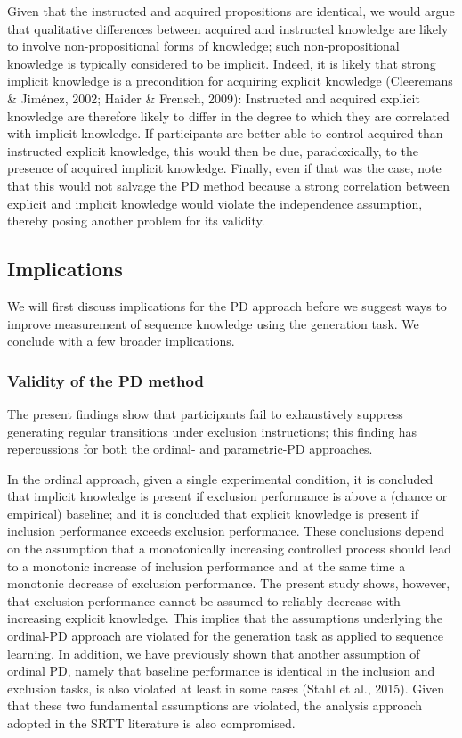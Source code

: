 \documentclass[jou]{apa6}
\theoremstyle{definition}
\theoremstyle{definition}
\theoremstyle{definition}
\theoremstyle{remark}
\begin{document}
Given that the instructed and acquired propositions are identical, we
would argue that qualitative differences between acquired and instructed
knowledge are likely to involve non-propositional forms of knowledge;
such non-propositional knowledge is typically considered to be implicit.
Indeed, it is likely that strong implicit knowledge is a precondition
for acquiring explicit knowledge (Cleeremans \& Jiménez, 2002; Haider \&
Frensch, 2009): Instructed and acquired explicit knowledge are therefore
likely to differ in the degree to which they are correlated with
implicit knowledge. If participants are better able to control acquired
than instructed explicit knowledge, this would then be due,
paradoxically, to the presence of acquired implicit knowledge. Finally,
even if that was the case, note that this would not salvage the PD
method because a strong correlation between explicit and implicit
knowledge would violate the independence assumption, thereby posing
another problem for its validity.

\subsection{Implications}\label{implications}

We will first discuss implications for the PD approach before we suggest
ways to improve measurement of sequence knowledge using the generation
task. We conclude with a few broader implications.

\subsubsection{Validity of the PD
method}\label{validity-of-the-pd-method}

The present findings show that participants fail to exhaustively
suppress generating regular transitions under exclusion instructions;
this finding has repercussions for both the ordinal- and parametric-PD
approaches.

In the ordinal approach, given a single experimental condition, it is
concluded that implicit knowledge is present if exclusion performance is
above a (chance or empirical) baseline; and it is concluded that
explicit knowledge is present if inclusion performance exceeds exclusion
performance. These conclusions depend on the assumption that a
monotonically increasing controlled process should lead to a monotonic
increase of inclusion performance and at the same time a monotonic
decrease of exclusion performance. The present study shows, however,
that exclusion performance cannot be assumed to reliably decrease with
increasing explicit knowledge. This implies that the assumptions
underlying the ordinal-PD approach are violated for the generation task
as applied to sequence learning. In addition, we have previously shown
that another assumption of ordinal PD, namely that baseline performance
is identical in the inclusion and exclusion tasks, is also violated at
least in some cases (Stahl et al., 2015). Given that these two
fundamental assumptions are violated, the analysis approach adopted in
the SRTT literature is also compromised.
\end{document}
